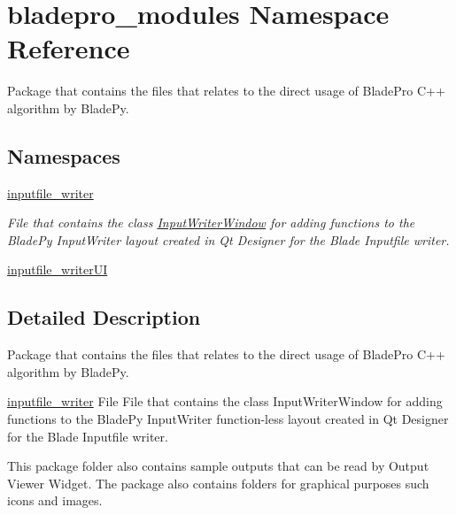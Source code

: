 \hypertarget{a00047}{}\section{bladepro\+\_\+modules Namespace Reference}
\label{a00047}


Package that contains the files that relates to the direct usage of Blade\+Pro C++ algorithm by Blade\+Py.  


\subsection*{Namespaces}
\begin{DoxyCompactItemize}
\item 
 \hyperlink{a00048}{inputfile\+\_\+writer}
\begin{DoxyCompactList}\small\item\em File that contains the class \hyperlink{a00070}{Input\+Writer\+Window} for adding functions to the Blade\+Py Input\+Writer layout created in Qt Designer for the Blade Inputfile writer. \end{DoxyCompactList}\item 
 \hyperlink{a00049}{inputfile\+\_\+writer\+UI}
\end{DoxyCompactItemize}


\subsection{Detailed Description}
Package that contains the files that relates to the direct usage of Blade\+Pro C++ algorithm by Blade\+Py. 

\begin{DoxyItemize}
\item {\ttfamily \hyperlink{a00048}{inputfile\+\_\+writer}} File File that contains the class Input\+Writer\+Window for adding functions to the Blade\+Py Input\+Writer function-\/less layout created in Qt Designer for the Blade Inputfile writer.\end{DoxyItemize}
This package folder also contains sample outputs that can be read by Output Viewer Widget. The package also contains folders for graphical purposes such icons and images. 